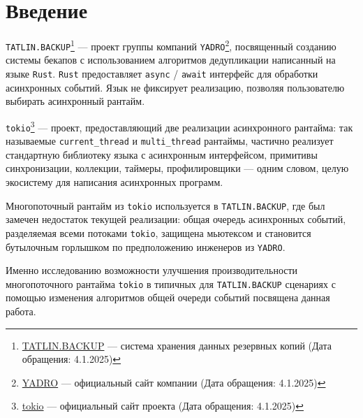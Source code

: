 
\section*{Введение}
\thispagestyle{withCompileDate}

\verb|TATLIN.BACKUP|\footnote{\href{https://yadro.com/ru/tatlin/backup}{TATLIN.BACKUP}
--- система хранения данных резервных копий (Дата обращения: 4.1.2025)} --- проект группы компаний \verb|YADRO|\footnote{\href{https://yadro.com/}{YADRO} --- официальный сайт компании (Дата обращения: 4.1.2025)}, посвященный созданию системы бекапов с использованием алгоритмов дедупликации написанный на языке \verb|Rust|. \verb|Rust| предоставляет \verb|async| / \verb|await|\cite{fsharpasyncawait} интерфейс для обработки асинхронных событий. Язык не фиксирует реализацию, позволяя пользователю выбирать асинхронный рантайм.

\verb|tokio|\footnote{\href{https://tokio.rs/}{tokio} --- официальный сайт проекта (Дата обращения: 4.1.2025)} --- проект, предоставляющий две реализации асинхронного рантайма: так называемые \verb|current_thread| и \verb|multi_thread| рантаймы, частично реализует стандартную библиотеку языка с асинхронным интерфейсом, примитивы синхронизации, коллекции, таймеры, профилировщики --- одним словом, целую экосистему для написания асинхронных программ.

Многопоточный рантайм из \verb|tokio| используется в \verb|TATLIN.BACKUP|, где был замечен недостаток текущей реализации: общая очередь асинхронных событий, разделяемая всеми потоками \verb|tokio|, защищена мьютексом и становится бутылочным горлышком по предположению инженеров из \verb|YADRO|.

Именно исследованию возможности улучшения производительности многопоточного рантайма \verb|tokio| в типичных для \verb|TATLIN.BACKUP| сценариях с помощью изменения алгоритмов общей очереди событий посвящена данная работа.
